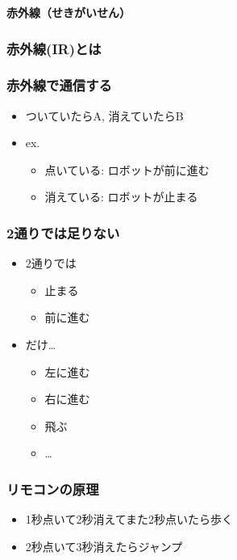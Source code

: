 \begin{frame}[plain]
    \begin{center}
        \vspace{48pt}
        {\huge\bf 赤外線（せきがいせん）}
    \end{center}
\end{frame}

\begin{frame}[fragile]
    \frametitle{赤外線(IR)とは}
    \centering
    
\end{frame}

\begin{frame}
    \frametitle{赤外線で通信する}
    \begin{itemize}
        \item ついていたらA, 消えていたらB
        \item ex.
        \begin{itemize}
            \item 点いている: ロボットが前に進む
            \item 消えている: ロボットが止まる
        \end{itemize}
    \end{itemize}
\end{frame}

\begin{frame}
   \frametitle{2通りでは足りない} 
   \begin{itemize}
        \item 2通りでは
        \begin{itemize}
            \item 止まる
            \item 前に進む
        \end{itemize}
        \item だけ\dots
        \begin{itemize}
            \item 左に進む
            \item 右に進む
            \item 飛ぶ
            \item \dots
        \end{itemize}
   \end{itemize}
\end{frame}

\begin{frame}
    \frametitle{リモコンの原理} 
    \begin{itemize}
        \item 1秒点いて2秒消えてまた2秒点いたら歩く
        \item 2秒点いて3秒消えたらジャンプ
    \end{itemize}
    \centering
    
\end{frame}

